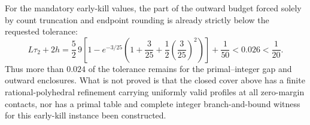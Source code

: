 For the mandatory early-kill values, the part of the outward budget forced solely by count truncation and endpoint rounding is already strictly below the requested tolerance:
\[
 L\tau_2+2h
 =\frac52\,9\left[1-e^{-3/25}
 \left(1+\frac3{25}+\frac12\left(\frac3{25}\right)^2\right)\right]
 +\frac1{50}
 <0.026<\frac1{20}.
\]
Thus more than \(0.024\) of the tolerance remains for the primal--integer gap and outward enclosures.  What is not proved is that the closed cover above has a finite rational-polyhedral refinement carrying uniformly valid profiles at all zero-margin contacts, nor has a primal table and complete integer branch-and-bound witness for this early-kill instance been constructed.
